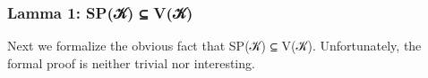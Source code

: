 \begin{code}
\<%
\\
%
\\[\AgdaEmptyExtraSkip]%
%
\>[3]\AgdaSpace{}%
\AgdaSymbol{:}\AgdaSpace{}%
\AgdaSpace{}%
\AgdaSpace{}%
\<%
\\
%
\>[3]\AgdaSpace{}%
\AgdaSymbol{=}\AgdaSpace{}%
\AgdaSpace{}%
\AgdaSpace{}%
\AgdaSpace{}%
\AgdaSpace{}%
\AgdaSpace{}%
\<%
\\
%
\\[\AgdaEmptyExtraSkip]%
%
\>[1]\AgdaSpace{}%
\AgdaSymbol{=}\AgdaSpace{}%
\AgdaSpace{}%
\<%
\\
%
\\[\AgdaEmptyExtraSkip]%
\>[0]\<%
\end{code}

\subsubsection{Lamma 1: SP(𝒦) ⊆ V(𝒦)}\label{lamma-1-spux1d4a6-vux1d4a6}

Next we formalize the obvious fact that SP(𝒦) ⊆ V(𝒦). Unfortunately, the
formal proof is neither trivial nor interesting.

